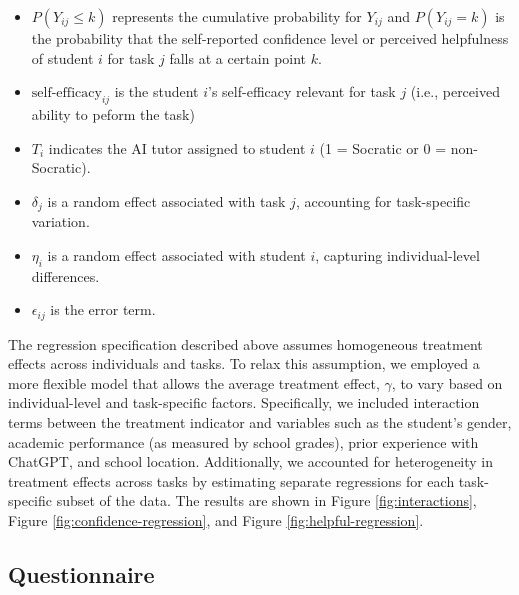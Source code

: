 \documentclass[
  12pt,
]{article}
\begin{document}
\begin{itemize}
\item
  \(P(Y_{ij} \leq k)\) represents the cumulative probability for \(Y_{ij}\) and \(P(Y_{ij} = k)\) is the probability that the self-reported confidence level or perceived helpfulness of student \(i\) for task \(j\) falls at a certain point \(k\).
\item
  \(\text{self-efficacy}_{ij}\) is the student \(i\)'s self-efficacy relevant for task \(j\) (i.e., perceived ability to peform the task)
\item
  \(T_i\) indicates the AI tutor assigned to student \(i\) (1 = Socratic or 0 = non-Socratic).
\item
  \(\delta_j\) is a random effect associated with task \(j\), accounting for task-specific variation.
\item
  \(\eta_i\) is a random effect associated with student \(i\), capturing individual-level differences.
\item
  \(\epsilon_{ij}\) is the error term.
\end{itemize}

The regression specification described above assumes homogeneous treatment effects across individuals and tasks. To relax this assumption, we employed a more flexible model that allows the average treatment effect, \(\gamma\), to vary based on individual-level and task-specific factors. Specifically, we included interaction terms between the treatment indicator and variables such as the student's gender, academic performance (as measured by school grades), prior experience with ChatGPT, and school location. Additionally, we accounted for heterogeneity in treatment effects across tasks by estimating separate regressions for each task-specific subset of the data. The results are shown in Figure \ref{fig:interactions}, Figure \ref{fig:confidence-regression}, and Figure \ref{fig:helpful-regression}.

\newpage

\subsection{Questionnaire}\label{sec:questionnaire}
\end{document}

